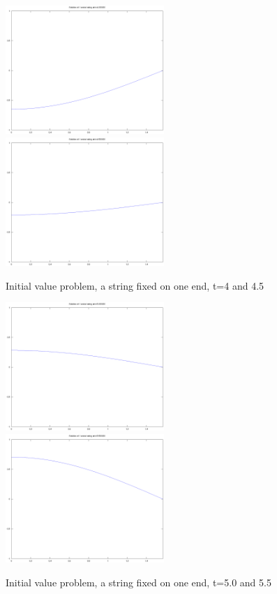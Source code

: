 \documentclass[a4paper,10pt]{report}
\begin{document}
\begin{figure}
 \includegraphics[width=6cm]{./one_fixed_end_analytic_t4.000000.eps}
\includegraphics[width=6cm]{./one_fixed_end_analytic_t4.500000.eps}

\caption{Initial value problem, a string fixed on one end, t=4 and 4.5}

\end{figure} 

\begin{figure}
 \includegraphics[width=6cm]{./one_fixed_end_analytic_t5.000000.eps}
\includegraphics[width=6cm]{./one_fixed_end_analytic_t5.500000.eps}

\caption{Initial value problem, a string fixed on one end, t=5.0 and 5.5}

\end{figure} 
\end{document}
